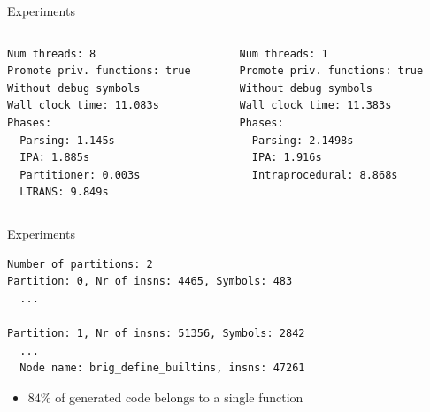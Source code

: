 \begin{frame}[fragile]{Experiments}
\begin{columns}
\begin{column}{0.5\textwidth}

\begin{verbatim}
Num threads: 8
Promote priv. functions: true
Without debug symbols
Wall clock time: 11.083s
Phases:
  Parsing: 1.145s
  IPA: 1.885s
  Partitioner: 0.003s
  LTRANS: 9.849s
\end{verbatim}

\end{column}


\begin{column}{0.5\textwidth}
\begin{verbatim}
Num threads: 1
Promote priv. functions: true
Without debug symbols
Wall clock time: 11.383s
Phases:
  Parsing: 2.1498s
  IPA: 1.916s
  Intraprocedural: 8.868s
\end{verbatim}
\end{column}
\end{columns}
\end{frame}

\begin{frame}[fragile]{Experiments}
\begin{verbatim}
Number of partitions: 2
Partition: 0, Nr of insns: 4465, Symbols: 483
  ...

Partition: 1, Nr of insns: 51356, Symbols: 2842
  ...
  Node name: brig_define_builtins, insns: 47261
\end{verbatim}
\begin{itemize}
    \item $84\%$ of generated code belongs to a single function
\end{itemize}

\end{frame}


